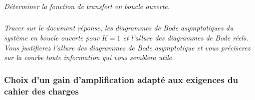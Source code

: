 \documentclass[10pt,fleqn]{article} %
\begin{document}
\subparagraph{}\textit{Déterminer la fonction de transfert en boucle ouverte.}%


\subparagraph{}\textit{Tracer sur le document réponse, les diagrammes de Bode asymptotiques du système en boucle ouverte pour $K=1$ et l'allure des diagrammes de Bode réels. Vous justifierez l’allure des diagrammes de Bode asymptotique et vous préciserez sur la courbe toute information qui vous semblera utile.}

%

%
%



\subsubsection*{Choix d'un gain d'amplification adapté aux exigences du cahier des charges\\}
\end{document}
